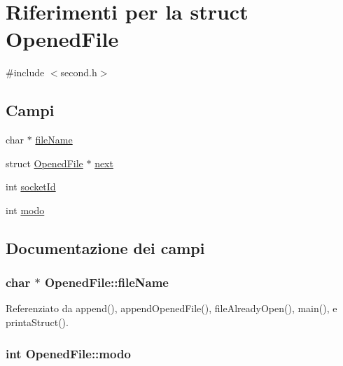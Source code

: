 \hypertarget{structOpenedFile}{}\section{Riferimenti per la struct Opened\+File}
\label{structOpenedFile}


{\ttfamily \#include $<$second.\+h$>$}

\subsection*{Campi}
\begin{DoxyCompactItemize}
\item 
char $\ast$ \hyperlink{structOpenedFile_abcff0610dfa8b1e3836b3f5bac40c8f5}{file\+Name}
\item 
struct \hyperlink{structOpenedFile}{Opened\+File} $\ast$ \hyperlink{structOpenedFile_a9b8c8b995cdda6da249a6ce9a9df98b2}{next}
\item 
int \hyperlink{structOpenedFile_a2af35018ecff06dbd349d464c815038a}{socket\+Id}
\item 
int \hyperlink{structOpenedFile_a6d9f22ff6ba81506ba9c4a60f27c4f32}{modo}
\end{DoxyCompactItemize}


\subsection{Documentazione dei campi}
\hypertarget{structOpenedFile_abcff0610dfa8b1e3836b3f5bac40c8f5}{}
\subsubsection[{file\+Name}]{\setlength{\rightskip}{0pt plus 5cm}char $\ast$ Opened\+File\+::file\+Name}\label{structOpenedFile_abcff0610dfa8b1e3836b3f5bac40c8f5}


Referenziato da append(), append\+Opened\+File(), file\+Already\+Open(), main(), e printa\+Struct().

\hypertarget{structOpenedFile_a6d9f22ff6ba81506ba9c4a60f27c4f32}{}
\subsubsection[{modo}]{\setlength{\rightskip}{0pt plus 5cm}int Opened\+File\+::modo}\label{structOpenedFile_a6d9f22ff6ba81506ba9c4a60f27c4f32}


